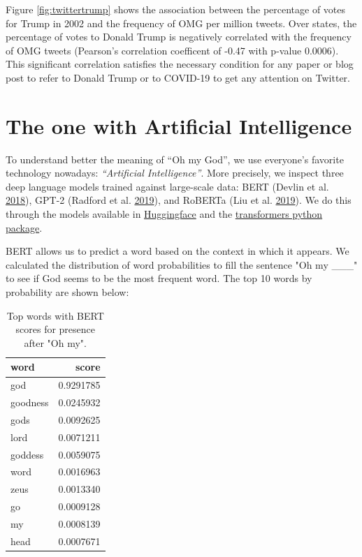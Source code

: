 \documentclass[]{article}
\begin{document}
Figure \ref{fig:twittertrump} shows the association between the percentage of votes for Trump in 2002 and the frequency of OMG per million tweets.
Over states, the percentage of votes to Donald Trump is negatively correlated with the frequency of OMG tweets (Pearson's correlation coefficent of -0.47 with p-value 0.0006). This significant correlation satisfies the necessary condition for any paper or blog post to refer to Donald Trump or to COVID-19 to get any attention on Twitter.

\newpage

\hypertarget{the-one-with-artificial-intelligence}{%
\section{The one with Artificial Intelligence}\label{the-one-with-artificial-intelligence}}

To understand better the meaning of ``Oh my God'', we use everyone's favorite technology nowadays: \emph{``Artificial Intelligence''}. More precisely, we inspect three deep language models trained against large-scale data: BERT (Devlin et al. \protect\hyperlink{ref-devlin2018bert}{2018}), GPT-2 (Radford et al. \protect\hyperlink{ref-radford2019language}{2019}), and RoBERTa (Liu et al. \protect\hyperlink{ref-liu2019roberta}{2019}). We do this through the models available in \href{https://huggingface.co/}{Huggingface} and the \href{https://pypi.org/project/transformers/}{transformers python package}.

BERT allows us to predict a word based on the context in which it appears. We calculated the distribution of word probabilities to fill the sentence "Oh my \_\_\_" to see if God seems to be the most frequent word. The top 10 words by probability are shown below:

\begin{table}[h]
\centering
\begin{tabular}{|l|r|}
\hline
word & score\\
\hline
god & 0.9291785\\
\hline
goodness & 0.0245932\\
\hline
gods & 0.0092625\\
\hline
lord & 0.0071211\\
\hline
goddess & 0.0059075\\
\hline
word & 0.0016963\\
\hline
zeus & 0.0013340\\
\hline
go & 0.0009128\\
\hline
my & 0.0008139\\
\hline
head & 0.0007671\\
\hline
\end{tabular}
\caption{Top words with BERT scores for presence after "Oh my".}
\end{table}
\end{document}
